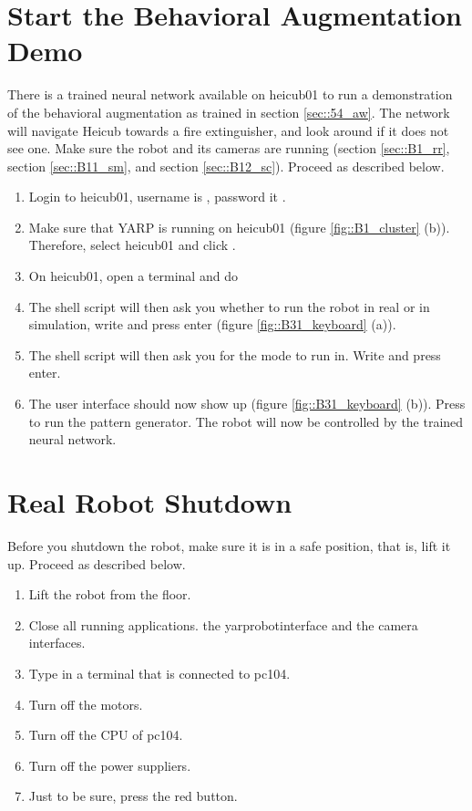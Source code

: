 \section{Start the Behavioral Augmentation Demo}
\label{sec::B4_ba}
There is a trained neural network available on heicub01 to run a demonstration of the behavioral augmentation as trained in section \ref{sec::54_aw}. The network will navigate Heicub towards a fire extinguisher, and look around if it does not see one. Make sure the robot and its cameras are running (section \ref{sec::B1_rr}, section \ref{sec::B11_sm}, and section \ref{sec::B12_sc}). Proceed as described below.
\begin{enumerate}
	\item Login to heicub01, username is , password it .
	\item Make sure that YARP is running on heicub01 (figure \ref{fig::B1_cluster} (b)). Therefore, select heicub01 and click .
	\item On heicub01, open a terminal and do 
	\newline {}
	\newline {}
	\item The shell script will then ask you whether to run the robot in real or in simulation, write  and press enter (figure \ref{fig::B31_keyboard} (a)).
	\item The shell script will then ask you for the mode to run in. Write  and press enter.
	\item The user interface should now show up (figure \ref{fig::B31_keyboard} (b)). Press  to run the pattern generator. The robot will now be controlled by the trained neural network.
\end{enumerate}
\section{Real Robot Shutdown}
Before you shutdown the robot, make sure it is in a safe position, that is, lift it up. Proceed as described below.
\begin{enumerate}
	\item Lift the robot from the floor.
	\item Close all running applications.  the yarprobotinterface and the camera interfaces.
	\item Type  in a terminal that is connected to pc104.
	\item Turn off the motors.
	\item Turn off the CPU of pc104.
	\item Turn off the power suppliers.
	\item Just to be sure, press the red button.
\end{enumerate}